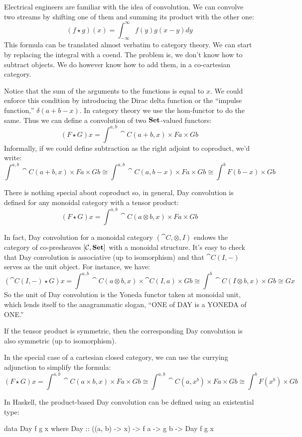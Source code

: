 \documentclass[DaoFP]{subfiles}
\begin{document}
Electrical engineers are familiar with the idea of convolution. We can convolve two streams by shifting one of them and summing its product with the other one: 
\[ (f \star g)(x) = \int^{\infty}_{-\infty} f(y) g(x - y) dy \]
This formula can be translated almost verbatim to category theory. We can start by replacing the integral with a coend. The problem is, we don't know how to subtract objects. We do however know how to add them, in a co-cartesian category. 

Notice that the sum of the arguments to the functions is equal to $x$. We could enforce this condition by introducing the Dirac delta function or the ``impulse function,'' $\delta(a + b - x)$. In category theory we use the hom-functor to do the same. Thus we can define a convolution of two $\mathbf{Set}$-valued functors:
\[ (F \star G) x = \int^{a, b} \cat C (a + b, x) \times F a \times G b \]
Informally, if we could define subtraction as the right adjoint to coproduct, we'd write:
\[ \int^{a, b} \cat C (a + b, x) \times F a \times G b \cong \int^{a, b} \cat C (a, b - x) \times F a \times G b \cong \int^b F (b - x) \times G b\]

There is nothing special about coproduct so, in general, Day convolution is defined for any monoidal category with a tensor product:
\[ (F \star G) x = \int^{a, b} \cat C (a \otimes b, x) \times F a \times G b \]

In fact, Day convolution for a monoidal category $(\cat C, \otimes, I)$ endows the category of co-presheaves $[\mathcal{C}, \mathbf{Set}]$ with a monoidal structure. It's easy to check that Day convolution is associative (up to isomorphism) and that $\cat C(I, -)$ serves as the unit object. For instance, we have:
\[ (\cat C(I, -) \star G) x =  \int^{a, b} \cat C (a \otimes b, x) \times \cat C(I, a) \times G b \cong 
  \int^{b} \cat C (I \otimes b, x) \times  G b \cong G x\]
So the unit of Day convolution is the Yoneda functor taken at monoidal unit, which lends itself to the anagrammatic slogan, ``ONE of DAY is a YONEDA of ONE.''

If the tensor product is symmetric, then the corresponding Day convolution is also symmetric (up to isomorphism).

In the special case of a cartesian closed category, we can use the currying adjunction to simplify the formula:
\[ (F \star G) x = \int^{a, b} \cat C (a \times b, x) \times F a \times G b \cong  \int^{a, b} \cat C (a, x^b) \times F a \times G b \cong  \int^{b}  F (x^b) \times G b\]

In Haskell, the product-based Day convolution can be defined using an existential type:
\begin{haskell}
data Day f g x where
  Day :: ((a, b) -> x) -> f a -> g b -> Day f g x
\end{haskell}
\end{document}
